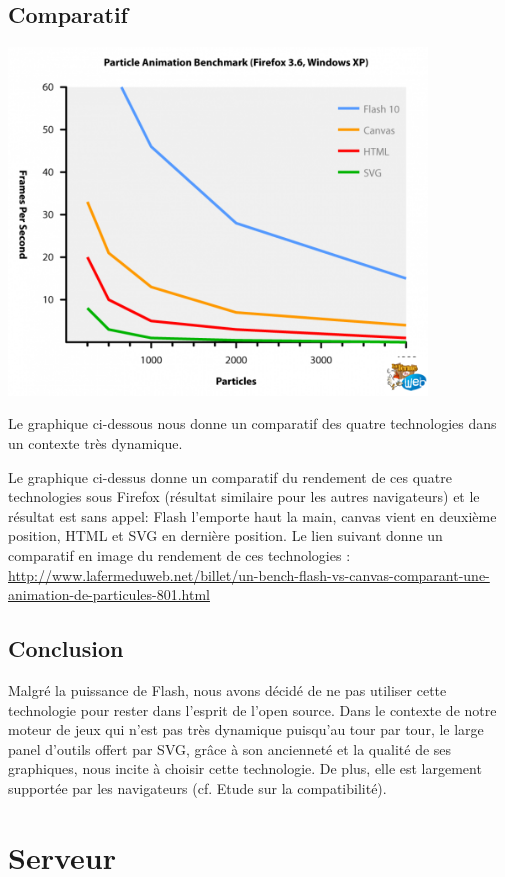 \documentclass[a4paper,10pt]{report}
\begin{document}
\section{Comparatif}

  \includegraphics[width=420px]{img/bench.png}

  Le graphique ci-dessous nous donne un comparatif des quatre technologies dans 
un contexte très dynamique.
 
Le graphique ci-dessus donne un comparatif du rendement de ces quatre technologies sous 
Firefox (résultat similaire pour les autres navigateurs) et le résultat est sans appel: 
Flash l'emporte haut la main, canvas vient en deuxième position, HTML et SVG en dernière 
position. Le lien suivant donne un comparatif en image du rendement de ces technologies : \url{http://www.lafermeduweb.net/billet/un-bench-flash-vs-canvas-comparant-une-animation-de-particules-801.html}

\section{Conclusion}
Malgré la puissance de Flash, nous avons décidé de ne pas utiliser cette 
technologie pour rester dans l'esprit de l'open source.
Dans le contexte de notre moteur de jeux qui n'est pas très dynamique puisqu'au tour par tour, le large panel 
d'outils offert par SVG, grâce à son ancienneté et la qualité de ses graphiques,
 nous incite à choisir cette technologie. De plus, elle est largement supportée par les navigateurs
 (cf. Etude sur la compatibilité).



\chapter{Serveur}
\end{document}
